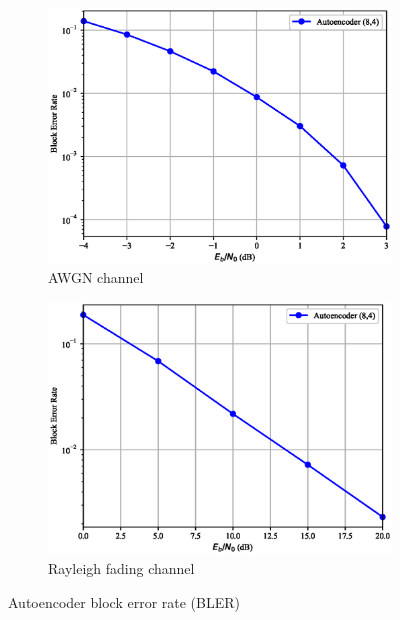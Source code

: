 \begin{figure}[tp] \label{fig:autoencoder_bler}
	\begin{subfigure}{0.235\textwidth}
		\includegraphics[width=\linewidth]{figs/autoencoder_bler_awgn}
		\caption{AWGN channel}
	\end{subfigure}
	\hspace*{\fill}
	\begin{subfigure}{0.235\textwidth}
		\includegraphics[width=\linewidth]{figs/autoencoder_bler_rayleigh}
		\caption{Rayleigh fading channel}	
	\end{subfigure}
	\caption{Autoencoder block error rate (BLER)}%
\end{figure}

